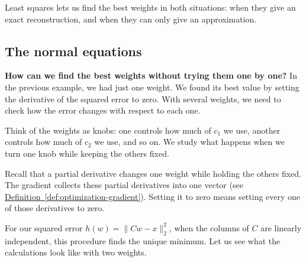 \documentclass[a4paper,12pt,oneside]{report}
\begin{document}
Least squares lets us find the best weights in both situations:
when they give an exact reconstruction, and when they can only give
an approximation.

\subsection{The normal equations}

\textbf{How can we find the best weights without trying them one by
one?} In the previous example, we had just one weight. We found its
best value by setting the derivative of the squared error to zero.
With several weights, we need to check how the error changes with
respect to each one.

Think of the weights as knobs: one controls how much of $c_1$ we use,
another controls how much of $c_2$ we use, and so on. We study what
happens when we turn one knob while keeping the others fixed.

Recall that a partial derivative changes one weight while holding
the others fixed. The gradient collects these partial derivatives
into one vector (see \hyperref[def:optimization-gradient]{Definition~\ref*{def:optimization-gradient}}).
Setting it to zero means setting every
one of those derivatives to zero.

For our squared error $h(w)=\lVert Cw-x\rVert_2^2$, when the columns
of $C$ are linearly independent, this procedure finds the unique
minimum. Let us see what the calculations look like with two weights.
\end{document}
